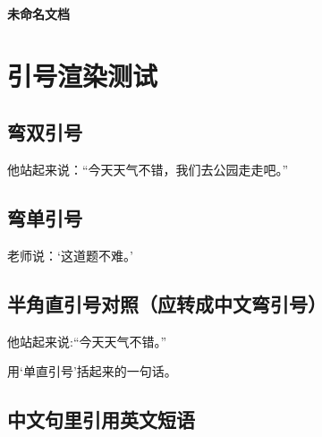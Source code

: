 \documentclass[zihao=-4]{ctexart}
\numberwithin{equation}{section}
\numberwithin{figure}{section}
\numberwithin{table}{section}
\theoremstyle{plain}
\begin{document}
\begin{titlepage}

\pagecolor{coverbg}

\thispagestyle{empty}

\color{black}

\centering

\vspace*{0.30\textheight}

{\bfseries 未命名文档}\\[0.9em]

\vspace{3.2em}

\vfill

\vfill

\vspace*{1.1cm}

\end{titlepage}

\nopagecolor

\setcounter{page}{1}


\tableofcontents

\clearpage


\setcounter{page}{1}

\section{引号渲染测试}

\subsection{弯双引号}

他站起来说：“今天天气不错，我们去公园走走吧。”

\subsection{弯单引号}

老师说：‘这道题不难。’

\subsection{半角直引号对照（应转成中文弯引号）}

他站起来说:“今天天气不错。”

用‘单直引号’括起来的一句话。

\subsection{中文句里引用英文短语}
\end{document}
